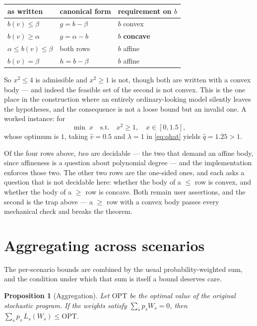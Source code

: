 \documentclass[11pt]{article}
\theoremstyle{plain}
\newtheorem{proposition}[lemma]{Proposition}
\theoremstyle{remark}
\newcommand{\W}{W}
\newcommand{\vhat}{\hat{v}}
\newcommand{\qhat}{\hat{q}}
\newcommand{\OPT}{\mathrm{OPT}}
\begin{document}
\begin{center}
\begin{tabular}{lll}
\toprule
as written & canonical form & requirement on $b$ \\
\midrule
$b(v) \le \beta$              & $g = b - \beta$              & $b$ convex \\
$b(v) \ge \alpha$             & $g = \alpha - b$             & $b$ \textbf{concave} \\
$\alpha \le b(v) \le \beta$   & both rows                    & $b$ affine \\
$b(v) = \beta$                & $h = b - \beta$              & $b$ affine \\
\bottomrule
\end{tabular}
\end{center}

So $x^2 \le 4$ is admissible and $x^2 \ge 1$ is not, though both are written with
a convex body --- and indeed the feasible set of the second is not convex.  This
is the one place in the construction where an entirely ordinary-looking model
silently leaves the hypotheses, and the consequence is not a loose bound but an
invalid one.  A worked instance: for
\[
  \min\; x \quad \text{s.t.} \quad x^2 \ge 1, \quad x \in [0, 1.5],
\]
whose optimum is $1$, taking $\vhat = 0.5$ and $\lambda = 1$ in \eqref{eq:qhat}
yields $\qhat = 1.25 > 1$.

Of the four rows above, \emph{two} are decidable --- the two that demand an
affine body, since affineness is a question about polynomial degree --- and the
implementation enforces those two.  The other two rows are the one-sided ones,
and each asks a question that is not decidable here: whether the body of a
$\le$ row is convex, and whether the body of a $\ge$ row is concave.  Both
remain user assertions, and the second is the trap above --- a $\ge$ row with a
convex body passes every mechanical check and breaks the theorem.

\section{Aggregating across scenarios}

The per-scenario bounds are combined by the usual probability-weighted sum, and
the condition under which that sum is itself a bound deserves care.

\begin{proposition}[Aggregation]\label{prop:agg}
Let $\OPT$ be the optimal value of the original stochastic program.  If the
weights satisfy $\sum_s p_s \W_s = 0$, then
$\sum_s p_s\, L_s(\W_s) \le \OPT$.
\end{proposition}
\end{document}
